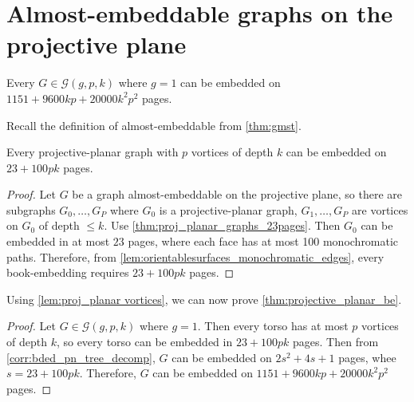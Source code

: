 
\section{Almost-embeddable graphs on the projective plane}

\begin{theorem}\label{thm:projective_planar_be}
	Every $G \in \mathcal{G}(g, p, k)$ where $g = 1$ can be embedded on $1151 + 9600 k p + 20000 k^2 p^2$ pages.
\end{theorem}
Recall the definition of almost-embeddable from \cref{thm:gmst}. 
\begin{lemma}\label{lem:proj_planar vortices}
	Every projective-planar graph with $p$ vortices of depth $k$ can be embedded on $23 + 100pk$ pages.
\end{lemma}
\begin{proof}
	Let $G$ be a graph almost-embeddable on the projective plane, so there are subgraphs $G_0, \ldots, G_P$ where $G_0$ is a projective-planar graph, $G_1, \ldots, G_P$ are vortices on $G_0$ of depth $\leq k$. Use \cref{thm:proj_planar_graphs_23pages}. Then $G_0$ can be embedded in at most $23$ pages, where each face has at most 100 monochromatic paths. Therefore, from \cref{lem:orientablesurfaces_monochromatic_edges}, every book-embedding requires $23 + 100pk$ pages.
\end{proof}

Using \cref{lem:proj_planar vortices}, we can now prove \cref{thm:projective_planar_be}.
\begin{proof}
	Let $G \in \mathcal{G}(g, p, k)$ where $g = 1$. Then every torso has at most $p$ vortices of depth $k$, so every torso can be embedded in $23 + 100 pk$ pages. Then from \cref{corr:bded_pn_tree_decomp}, $G$ can be embedded on $2s^2 + 4s + 1$ pages, whee $s = 23 + 100pk$. Therefore, $G$ can be embedded on $1151 + 9600 k p + 20000 k^2 p^2$ pages.
\end{proof}
